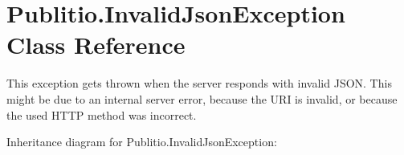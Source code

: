 \hypertarget{classPublitio_1_1InvalidJsonException}{}\section{Publitio.\+Invalid\+Json\+Exception Class Reference}
\label{classPublitio_1_1InvalidJsonException}


This exception gets thrown when the server responds with invalid J\+S\+ON. This might be due to an internal server error, because the U\+RI is invalid, or because the used H\+T\+TP method was incorrect. 




Inheritance diagram for Publitio.\+Invalid\+Json\+Exception\+:
